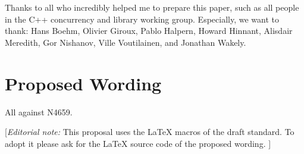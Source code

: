 Thanks to all who incredibly helped me to prepare this paper, such as all people in the C++ concurrency and library working group.
Especially, we want to thank: Hans Boehm, Olivier Giroux, Pablo Halpern, Howard Hinnant, Alisdair Meredith, Gor Nishanov, Ville Voutilainen, and Jonathan Wakely.


\section*{Proposed Wording}
All against N4659.

{\color{blue}
[{\itshape{}Editorial note:} This proposal uses the LaTeX macros of the draft standard.
        To adopt it please ask for the LaTeX source code of the proposed wording. ]
}

\clearpage

